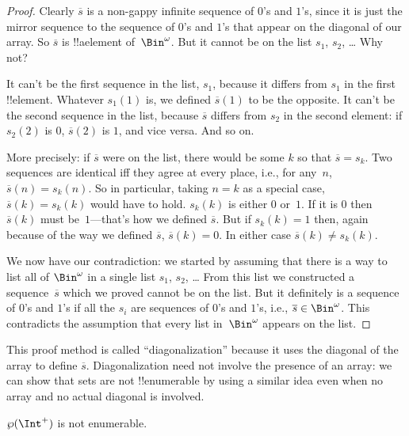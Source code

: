 \documentclass[../../../include/open-logic-section]{subfiles}
\begin{document}
\begin{proof}
Clearly $\overline{s}$ is a non-gappy infinite sequence of $0$'s and
$1$'s, since it is just the mirror sequence to the sequence of $0$'s
and $1$'s that appear on the diagonal of our array.  So $\overline{s}$
is !!a{element} of~$\Bin^\omega$.  But it cannot be on the list $s_1$,
$s_2$, \dots{} Why not?

It can't be the first sequence in the list, $s_1$, because it differs from
$s_1$ in the first !!{element}.  Whatever $s_1(1)$ is, we defined
$\overline{s}(1)$ to be the opposite.  It can't be the second
sequence in the list, because $\overline{s}$ differs from $s_2$ in the second
element: if $s_2(2)$ is $0$, $\overline{s}(2)$ is $1$, and vice
versa. And so on.

More precisely: if $\overline{s}$ were on the list, there would be
some $k$ so that $\overline{s} = s_{k}$.  Two sequences are identical
iff they agree at every place, i.e., for any~$n$, $\overline{s}(n) =
s_{k}(n)$.  So in particular, taking $n = k$ as a special case,
$\overline{s}(k) = s_{k}(k)$ would have to hold. $s_k(k)$ is either
$0$ or~$1$. If it is $0$ then $\overline{s}(k)$ must be~$1$---that's
how we defined $\overline{s}$. But if $s_k(k) = 1$ then, again because
of the way we defined $\overline{s}$, $\overline{s}(k) = 0$. In either
case $\overline{s}(k) \neq s_{k}(k)$.

We now have our contradiction: we started by assuming that there is a
way to list all of $\Bin^\omega$ in a single list $s_1$, $s_2$,
\dots{} From this list we constructed a sequence~$\overline{s}$ which
we proved cannot be on the list.  But it definitely is a sequence of
$0$'s and $1$'s if all the $s_i$ are sequences of $0$'s and $1$'s,
i.e., $\overline{s} \in \Bin^\omega$. This contradicts the assumption
that every list in~$\Bin^\omega$ appears on the list.
\end{proof}

\begin{explain}
This proof method is called ``diagonalization'' because it uses the
diagonal of the array to define $\overline{s}$. Diagonalization need
not involve the presence of an array: we can show that sets are not
!!{enumerable} by using a similar idea even when no array and no
actual diagonal is involved.
\end{explain}

\begin{thm}
$\Pow{\Int^+}$ is not enumerable.
\end{thm}
\end{document}
